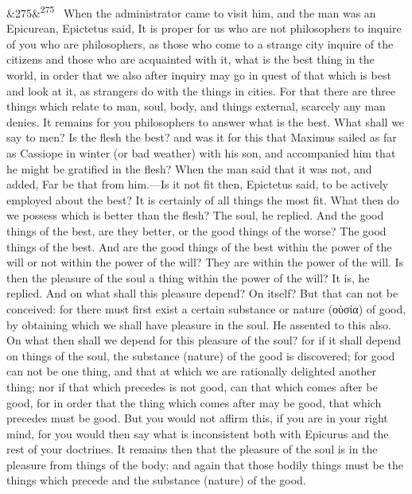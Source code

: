 \documentclass[12pt]{article}
\newcommand{\para}[1][]{\par\noindent\ifx&#1&\else\textsuperscript{\footnotesize #1}~\fi}
\begin{document}
\para[275] When the administrator came to visit him, and the man was an Epicurean, Epictetus said, It is proper for us who are not philosophers to inquire of you who are philosophers, as those who come to a strange city inquire of the citizens and those who are acquainted with it, what is the best thing in the world, in order that we also after inquiry may go in quest of that which is best and look at it, as strangers do with the things in cities. For that there are three things which relate to man, soul, body, and things external, scarcely any man denies. It remains for you philosophers to answer what is the best. What shall we say to men? Is the flesh the best? and was it for this that Maximus sailed as far as Cassiope in winter (or bad weather) with his son, and accompanied him that he might be gratified in the flesh? When the man said that it was not, and added, Far be that from him.—Is it not fit then, Epictetus said, to be actively employed about the best? It is certainly of all things the most fit. What then do we possess which is better than the flesh? The soul, he replied. And the good things of the best, are they better, or the good things of the worse? The good things of the best. And are the good things of the best within the power of the will or not within the power of the will? They are within the power of the will. Is then the pleasure of the soul a thing within the power of the will? It is, he replied. And on what shall this pleasure depend? On itself? But that can not be conceived: for there must first exist a certain substance or nature (οὐσία) of good, by obtaining which we shall have pleasure in the soul. He assented to this also. On what then shall we depend for this pleasure of the soul? for if it shall depend on things of the soul, the substance (nature) of the good is discovered; for good can not be one thing, and that at which we are rationally delighted another thing; nor if that which precedes is not good, can that which comes after be good, for in order that the thing which comes after may be good, that which precedes must be good. But you would not affirm this, if you are in your right mind, for you would then say what is inconsistent both with Epicurus and the rest of your doctrines. It remains then that the pleasure of the soul is in the pleasure from things of the body: and again that those bodily things must be the things which precede and the substance (nature) of the good.
\end{document}
